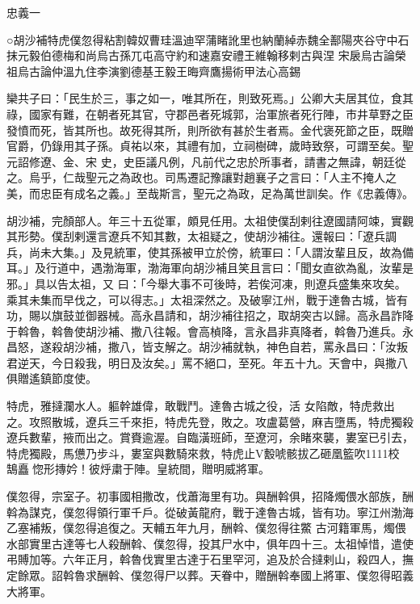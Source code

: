 
\begin{pinyinscope}

 忠義一



 ○胡沙補特虎僕忽得粘割韓奴曹珪溫迪罕蒲睹訛里也納蘭綽赤魏全鄯陽夾谷守中石抹元毅伯德梅和尚烏古孫兀屯高守約和速嘉安禮王維翰移剌古與涅
 宋扆烏古論榮祖烏古論仲溫九住李演劉德基王毅王晦齊鷹揚術甲法心高錫



 欒共子曰：「民生於三，事之如一，唯其所在，則致死焉。」公卿大夫居其位，食其祿，國家有難，在朝者死其官，守郡邑者死城郭，治軍旅者死行陣，市井草野之臣發憤而死，皆其所也。故死得其所，則所欲有甚於生者焉。金代褒死節之臣，既贈官爵，仍錄用其子孫。貞祐以來，其禮有加，立祠樹碑，歲時致祭，可謂至矣。聖元詔修遼、金、宋
 史，史臣議凡例，凡前代之忠於所事者，請書之無諱，朝廷從之。烏乎，仁哉聖元之為政也。司馬遷記豫讓對趙襄子之言曰：「人主不掩人之美，而忠臣有成名之義。」至哉斯言，聖元之為政，足為萬世訓矣。作《忠義傳》。



 胡沙補，完顏部人。年三十五從軍，頗見任用。太祖使僕刮剌往遼國請阿竦，實觀其形勢。僕刮剌還言遼兵不知其數，太祖疑之，使胡沙補往。還報曰：「遼兵調兵，尚未大集。」及見統軍，使其孫被甲立於傍，統軍曰：「人謂汝輩且反，故為備耳。」及行道中，遇渤海軍，渤海軍向胡沙補且笑且言曰：「聞女直欲為亂，汝輩是邪。」具以告太祖，又
 曰：「今舉大事不可後時，若俟河凍，則遼兵盛集來攻矣。乘其未集而早伐之，可以得志。」太祖深然之。及破寧江州，戰于達魯古城，皆有功，賜以旗鼓並御器械。高永昌請和，胡沙補往招之，取胡突古以歸。高永昌詐降于斡魯，斡魯使胡沙補、撒八往報。會高楨降，言永昌非真降者，斡魯乃進兵。永昌怒，遂殺胡沙補，撒八，皆支解之。胡沙補就執，神色自若，罵永昌曰：「汝叛君逆天，今日殺我，明日及汝矣。」罵不絕口，至死。年五十九。天會中，與撒八俱贈遙鎮節度使。



 特虎，雅撻瀾水人。軀幹雄偉，敢戰鬥。達魯古城之役，活
 女陷敵，特虎救出之。攻照散城，遼兵三千來拒，特虎先登，敗之。攻盧葛營，麻吉墮馬，特虎獨殺遼兵數輩，掖而出之。賞賚逾渥。自臨潢班師，至遼河，余睹來襲，婁室已引去，特虎獨殿，馬憊乃步斗，婁室與數騎來救，特虎止V毄唬骸拔乙砸凰籃吹1111校鵠矗惚形摶妗！彼烀粛于陣。皇統間，贈明威將軍。



 僕忽得，宗室子。初事國相撒改，伐蕭海里有功。與酬斡俱，招降燭偎水部族，酬斡為謀克，僕忽得領行軍千戶。從破黃龍府，戰于達魯古城，皆有功。寧江州渤海乙塞補叛，僕忽得追復之。天輔五年九月，酬斡、僕忽得往鱉
 古河籍軍馬，燭偎水部實里古達等七人殺酬斡、僕忽得，投其尸水中，俱年四十三。太祖悼惜，遣使弔賻加等。六年正月，斡魯伐實里古達于石里罕河，追及於合撻剌山，殺四人，撫定餘眾。詔斡魯求酬斡、僕忽得尸以葬。天眷中，贈酬斡奉國上將軍、僕忽得昭義大將軍。




\end{pinyinscope}
